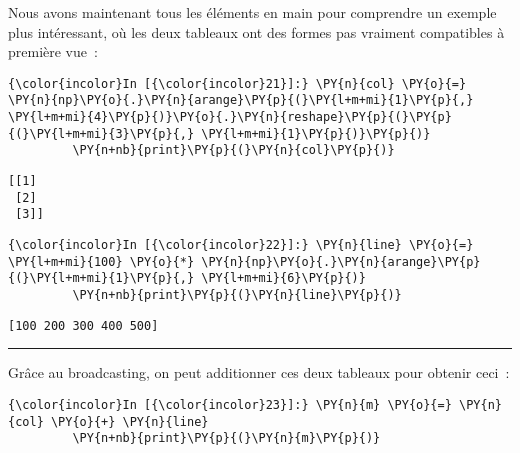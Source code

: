     Nous avons maintenant tous les éléments en main pour comprendre un
exemple plus intéressant, où les deux tableaux ont des formes pas
vraiment compatibles à première vue~:

    \begin{Verbatim}[commandchars=\\\{\},frame=single,framerule=0.3mm,rulecolor=\color{cellframecolor}]
{\color{incolor}In [{\color{incolor}21}]:} \PY{n}{col} \PY{o}{=} \PY{n}{np}\PY{o}{.}\PY{n}{arange}\PY{p}{(}\PY{l+m+mi}{1}\PY{p}{,} \PY{l+m+mi}{4}\PY{p}{)}\PY{o}{.}\PY{n}{reshape}\PY{p}{(}\PY{p}{(}\PY{l+m+mi}{3}\PY{p}{,} \PY{l+m+mi}{1}\PY{p}{)}\PY{p}{)}
         \PY{n+nb}{print}\PY{p}{(}\PY{n}{col}\PY{p}{)}
\end{Verbatim}


    \begin{Verbatim}[commandchars=\\\{\},frame=single,framerule=0.3mm,rulecolor=\color{cellframecolor}]
[[1]
 [2]
 [3]]
\end{Verbatim}

    \begin{Verbatim}[commandchars=\\\{\},frame=single,framerule=0.3mm,rulecolor=\color{cellframecolor}]
{\color{incolor}In [{\color{incolor}22}]:} \PY{n}{line} \PY{o}{=} \PY{l+m+mi}{100} \PY{o}{*} \PY{n}{np}\PY{o}{.}\PY{n}{arange}\PY{p}{(}\PY{l+m+mi}{1}\PY{p}{,} \PY{l+m+mi}{6}\PY{p}{)}
         \PY{n+nb}{print}\PY{p}{(}\PY{n}{line}\PY{p}{)}
\end{Verbatim}


    \begin{Verbatim}[commandchars=\\\{\},frame=single,framerule=0.3mm,rulecolor=\color{cellframecolor}]
[100 200 300 400 500]
\end{Verbatim}

    \begin{center}\rule{0.5\linewidth}{\linethickness}\end{center}

    Grâce au broadcasting, on peut additionner ces deux tableaux pour
obtenir ceci~:

    \begin{Verbatim}[commandchars=\\\{\},frame=single,framerule=0.3mm,rulecolor=\color{cellframecolor}]
{\color{incolor}In [{\color{incolor}23}]:} \PY{n}{m} \PY{o}{=} \PY{n}{col} \PY{o}{+} \PY{n}{line}
         \PY{n+nb}{print}\PY{p}{(}\PY{n}{m}\PY{p}{)}
\end{Verbatim}


